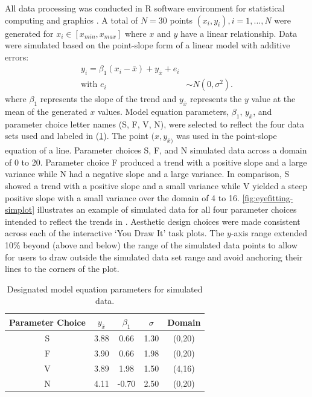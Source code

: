 \documentclass[12pt]{article}
\begin{document}
All data processing was conducted in R software environment for
statistical computing and graphics \citep{Rsoftware}. A total of
\(N = 30\) points \((x_i, y_i), i = 1,...,N\) were generated for
\(x_i \in [x_{min}, x_{max}]\) where \(x\) and \(y\) have a linear
relationship. Data were simulated based on the point-slope form of a
linear model with additive errors: \begin{align}
y_i = \beta_1(x_i-\bar{x}) + y_{\bar{x}} + e_i \\
\text{with } e_i & \sim N(0, \sigma^2). \nonumber
\end{align} where \(\beta_1\) represents the slope of the trend and
\(y_{\bar{x}}\) represents the \(y\) value at the mean of the generated
\(x\) values. Model equation parameters, \(\beta_1\), \(y_{\bar{x}}\),
and parameter choice letter names (S, F, V, N), were selected to reflect
the four data sets used and labeled in \citet{mosteller1981eye}
(\cref{tab:eyefitting-parameters}). The point \((x, y_{\bar{x})}\) was
used in the point-slope equation of a line. Parameter choices S, F, and
N simulated data across a domain of 0 to 20. Parameter choice F produced
a trend with a positive slope and a large variance while N had a
negative slope and a large variance. In comparison, S showed a trend
with a positive slope and a small variance while V yielded a steep
positive slope with a small variance over the domain of 4 to 16.
\cref{fig:eyefitting-simplot} illustrates an example of simulated data
for all four parameter choices intended to reflect the trends in
\citet{mosteller1981eye}. Aesthetic design choices were made consistent
across each of the interactive `You Draw It' task plots. The \(y\)-axis
range extended 10\% beyond (above and below) the range of the simulated
data points to allow for users to draw outside the simulated data set
range and avoid anchoring their lines to the corners of the plot.

\begin{table}

\caption{\label{tab:eyefitting-parameters}Designated model equation parameters for simulated data.}
\centering
\begin{tabular}[t]{ccccc}
\toprule
Parameter Choice & $y_{\bar{x}}$ & $\beta_1$ & $\sigma$ & Domain\\
\midrule
S & 3.88 & 0.66 & 1.30 & (0,20)\\
F & 3.90 & 0.66 & 1.98 & (0,20)\\
V & 3.89 & 1.98 & 1.50 & (4,16)\\
N & 4.11 & -0.70 & 2.50 & (0,20)\\
\bottomrule
\end{tabular}
\end{table}
\end{document}
